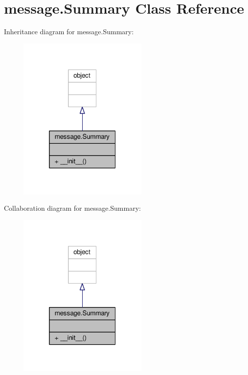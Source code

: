 \hypertarget{classmessage_1_1Summary}{}\section{message.\+Summary Class Reference}
\label{classmessage_1_1Summary}


Inheritance diagram for message.\+Summary\+:
\nopagebreak
\begin{figure}[H]
\begin{center}
\leavevmode
\includegraphics[width=181pt]{classmessage_1_1Summary__inherit__graph}
\end{center}
\end{figure}


Collaboration diagram for message.\+Summary\+:
\nopagebreak
\begin{figure}[H]
\begin{center}
\leavevmode
\includegraphics[width=181pt]{classmessage_1_1Summary__coll__graph}
\end{center}
\end{figure}

